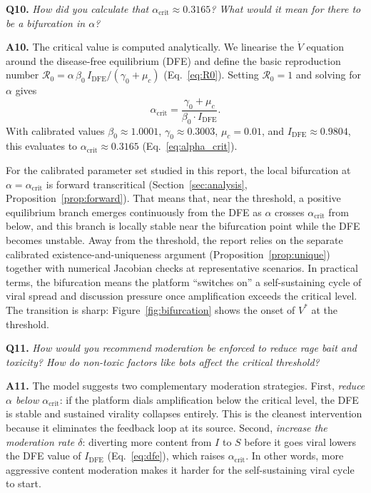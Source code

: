 \documentclass[11pt]{article}
\begin{document}
\bigskip

\noindent\textbf{Q10.} \textit{How did you calculate that $\alpha_{\mathrm{crit}} \approx 0.3165$? What would it mean for there to be a bifurcation in $\alpha$?}

\medskip
\noindent\textbf{A10.}
The critical value is computed analytically.
We linearise the $\dot{V}$ equation around the disease-free equilibrium (DFE) and define the basic reproduction number $\mathcal{R}_0 = \alpha\,\beta_0\,I_{\mathrm{DFE}} / (\gamma_0 + \mu_c)$ (Eq.~\ref{eq:R0}).
Setting $\mathcal{R}_0 = 1$ and solving for $\alpha$ gives
\[
\alpha_{\mathrm{crit}} = \frac{\gamma_0 + \mu_c}{\beta_0 \cdot I_{\mathrm{DFE}}}.
\]
With calibrated values $\beta_0 \approx 1.0001$, $\gamma_0 \approx 0.3003$, $\mu_c = 0.01$, and $I_{\mathrm{DFE}} \approx 0.9804$, this evaluates to $\alpha_{\mathrm{crit}} \approx 0.3165$ (Eq.~\ref{eq:alpha_crit}).

For the calibrated parameter set studied in this report, the local bifurcation at $\alpha=\alpha_{\mathrm{crit}}$ is forward transcritical (Section~\ref{sec:analysis}, Proposition~\ref{prop:forward}).
That means that, near the threshold, a positive equilibrium branch emerges continuously from the DFE as $\alpha$ crosses $\alpha_{\mathrm{crit}}$ from below, and this branch is locally stable near the bifurcation point while the DFE becomes unstable.
Away from the threshold, the report relies on the separate calibrated existence-and-uniqueness argument (Proposition~\ref{prop:unique}) together with numerical Jacobian checks at representative scenarios.
In practical terms, the bifurcation means the platform ``switches on'' a self-sustaining cycle of viral spread and discussion pressure once amplification exceeds the critical level.
The transition is sharp: Figure~\ref{fig:bifurcation} shows the onset of $V^*$ at the threshold.

\bigskip

\noindent\textbf{Q11.} \textit{How would you recommend moderation be enforced to reduce rage bait and toxicity? How do non-toxic factors like bots affect the critical threshold?}

\medskip
\noindent\textbf{A11.}
The model suggests two complementary moderation strategies.
First, \emph{reduce $\alpha$ below $\alpha_{\mathrm{crit}}$}: if the platform dials amplification below the critical level, the DFE is stable and sustained virality collapses entirely. This is the cleanest intervention because it eliminates the feedback loop at its source.
Second, \emph{increase the moderation rate $\delta$}: diverting more content from $I$ to $S$ before it goes viral lowers the DFE value of $I_{\mathrm{DFE}}$ (Eq.~\ref{eq:dfe}), which raises $\alpha_{\mathrm{crit}}$. In other words, more aggressive content moderation makes it harder for the self-sustaining viral cycle to start.
\end{document}
